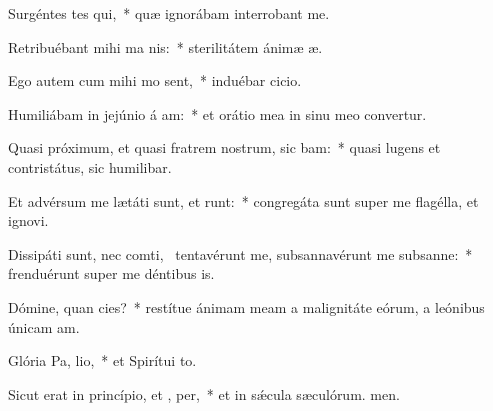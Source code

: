 \item Surgéntes tes qui,~* quæ ignorábam interrobant me.
\item Retribuébant mihi ma  nis:~* sterilitátem ánimæ æ.
\item Ego autem cum mihi mo sent,~* induébar cicio.
\item Humiliábam in jejúnio á am:~* et orátio mea in sinu meo convertur.
\item Quasi próximum, et quasi fratrem nostrum, sic bam:~* quasi lugens et contristátus, sic humilibar.
\item Et advérsum me lætáti sunt, et runt:~* congregáta sunt super me flagélla, et ignovi.
\item Dissipáti sunt, nec comti,~\pscross{} tentavérunt me, subsannavérunt me subsanne:~* frenduérunt super me déntibus is.
\item Dómine, quan cies?~* restítue ánimam meam a malignitáte eórum, a leónibus únicam am.
\item Glória Pa,  lio,~* et Spirítui to.
\item Sicut erat in princípio, et ,  per,~* et in sǽcula sæculórum. men.
